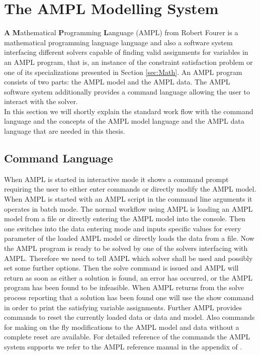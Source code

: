 \section{The AMPL Modelling System}
\label{sec:AMPL}
\textbf{A} \textbf{M}athematical \textbf{P}rogramming \textbf{L}anguage (AMPL) from Robert Fourer \cite{AMPL} is a mathematical programming language language and also a software system interfacing different solvers capable of finding valid assignments for variables in an AMPL program, that is, an instance of the constraint satisfaction problem or one of its specializations presented in Section \ref{sec:Math}.
An AMPL program consists of two parts: the AMPL model and the AMPL data. The AMPL software system additionally provides a command language allowing the user to interact with the solver.\\
 
In this section we will shortly explain the standard work flow with the command language and the concepts of the AMPL model language and the AMPL data language that are needed in this thesis.
\subsection{Command Language}
\label{sec:AMPLcommandLanguage}
When AMPL is started in interactive mode it shows a command prompt requiring the user to either enter commands or directly modify the AMPL model. When AMPL is started with an AMPL script in the command line arguments it operates in batch mode.
The normal workflow using AMPL is loading an AMPL model from a file or directly entering the AMPL model into the console. Then one switches into the data entering mode and inputs specific values for every parameter of the loaded AMPL model or directly loads the data from a file. Now the AMPL program is ready to be solved by one of the solvers interfacing with AMPL. Therefore we need to tell AMPL which solver shall be used and possibly set some further options. Then the solve command is issued and AMPL will return as soon as either a solution is found, an error has occurred, or the AMPL program has been found to be infeasible. When AMPL returns from the solve process reporting that a solution has been found one will use the show command in order to print the satisfying variable assignments.
Further AMPL provides commands to reset the currently loaded data or data and model. Also commands for making on the fly modifications to the AMPL model and data without a complete reset are available. For detailed reference of the commands the AMPL system supports we refer to the AMPL reference manual in the appendix of \cite{AMPL}.
